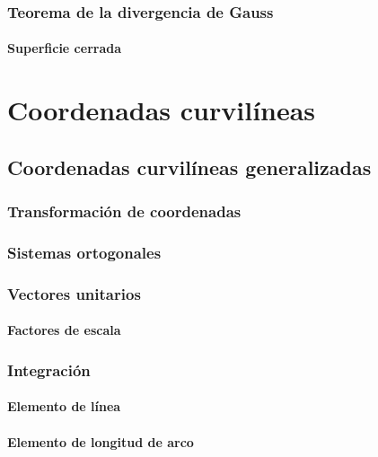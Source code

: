 \documentclass[12pt, fleqn]{report}                             %
\theoremstyle{break}                                            %
\begin{document}
        \section{Teorema de la divergencia de Gauss}
        
            \subsection{Superficie cerrada}


\part{Coordenadas curvilíneas}

    \chapter{Coordenadas curvilíneas generalizadas}
    
        \section{Transformación de coordenadas}
        
        \section{Sistemas ortogonales}
        
        \section{Vectores unitarios}
        
            \subsection{Factores de escala}
        
        \section{Integración}
        
            \subsection{Elemento de línea}
            
            \subsection{Elemento de longitud de arco}
            
\end{document}
